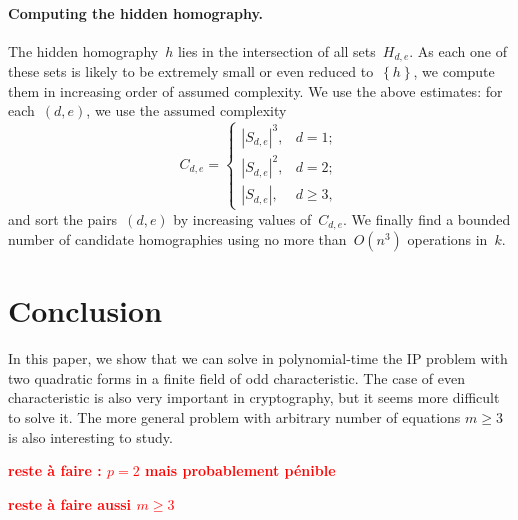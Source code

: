 \documentclass{lms}%
\def\acco#1{\left\{#1\right\}}
\def\abs#1{\left|#1\right|}
\def\card#1{\abs{#1}}
\def\commentaire#1{{\bfseries\textcolor{red}{#1}}}
\begin{document}
\paragraph{Computing the hidden homography.}

The hidden homography~$h$ lies in the intersection of all sets~$H_{d,e}$.
As each one of these sets is likely to be extremely small or even reduced
to~$\acco{h}$, we compute them in increasing order of assumed complexity.
We use the above estimates: for each~$(d,e)$, we use the assumed complexity
\begin{equation}
C_{d,e} = \begin{cases}
\card{S_{d,e}}^3,& d = 1;\\
\card{S_{d,e}}^2,& d = 2;\\
\card{S_{d,e}},& d≥ 3,
\end{cases}
\end{equation}
and sort the pairs~$(d,e)$ by increasing values of~$C_{d,e}$. We finally
find a bounded number of candidate homographies using no more
than~$O(n^3)$ operations in~$k$.

\section*{Conclusion}
In this paper, we show that we can solve in polynomial-time the IP problem with two quadratic forms in a finite field 
of odd characteristic. The case of even characteristic is also very important in cryptography, but it seems more difficult
to solve it. The more general problem with arbitrary number of equations $m ≥3$ is also interesting to study. 


\commentaire{reste à faire : $p = 2$ mais probablement pénible}

\commentaire{reste à faire aussi $m ≥ 3$}



\end{document}
